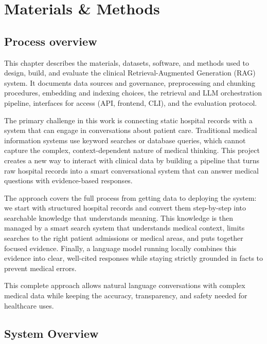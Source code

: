 \chapter{Materials \& Methods}

\section{Process overview}
This chapter describes the materials, datasets, software, and methods used to design, build, and evaluate the clinical Retrieval-Augmented Generation (RAG) system. It documents data sources and governance, preprocessing and chunking procedures, embedding and indexing choices, the retrieval and LLM orchestration pipeline, interfaces for access (API, frontend, CLI), and the evaluation protocol.

The primary challenge in this work is connecting static hospital records with a system that can engage in conversations about patient care. Traditional medical information systems use keyword searches or database queries, which cannot capture the complex, context-dependent nature of medical thinking. This project creates a new way to interact with clinical data by building a pipeline that turns raw hospital records into a smart conversational system that can answer medical questions with evidence-based responses.


The approach covers the full process from getting data to deploying the system: we start with structured hospital records and convert them step-by-step into searchable knowledge that understands meaning. This knowledge is then managed by a smart search system that understands medical context, limits searches to the right patient admissions or medical areas, and puts together focused evidence. Finally, a language model running locally combines this evidence into clear, well-cited responses while staying strictly grounded in facts to prevent medical errors.

This complete approach allows natural language conversations with complex medical data while keeping the accuracy, transparency, and safety needed for healthcare uses.

\newpage
\section{System Overview}

